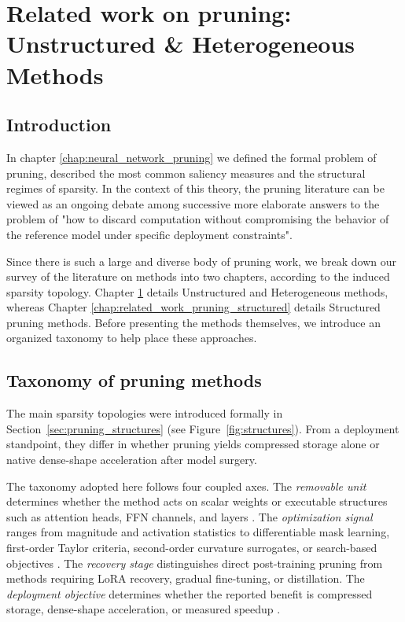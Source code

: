 \providecommand{\methoddetail}[1]{}
\providecommand{\methodsep}{}
\chapter{Related work on pruning: Unstructured \& Heterogeneous Methods}
\label{chap:related_work_pruning_unstructured}

\section{Introduction}

In chapter \ref{chap:neural_network_pruning} we defined the formal problem of pruning, described the most common saliency measures and the structural regimes of sparsity. In the context of this theory, the pruning literature can be viewed as an ongoing debate among successive more elaborate answers to the problem of "how to discard computation without compromising the behavior of the reference model under specific deployment constraints".

Since there is such a large and diverse body of pruning work, we break down our survey of the literature on methods into two chapters, according to the induced sparsity topology. Chapter \ref{chap:related_work_pruning_unstructured} details Unstructured and Heterogeneous methods, whereas Chapter \ref{chap:related_work_pruning_structured}
details Structured pruning methods. Before presenting the methods themselves, we introduce an organized taxonomy to help place these approaches.

\section{Taxonomy of pruning methods}
The main sparsity topologies were introduced formally in Section~\ref{sec:pruning_structures} (see Figure~\ref{fig:structures}). From a deployment standpoint, they differ in whether pruning yields compressed storage alone or native dense-shape acceleration after model surgery.

The taxonomy adopted here follows four coupled axes. The \emph{removable unit} determines whether the method acts on scalar weights or executable structures such as attention heads, FFN channels, and layers \cite{michel2022not,kurtic2022optimal}. The \emph{optimization signal} ranges from magnitude and activation statistics to differentiable mask learning, first-order Taylor criteria, second-order curvature surrogates, or search-based objectives \cite{sun2023simple,xia2022structured,ma2023llmpruner,frantar2023sparsegpt,kwon2022fast}. The \emph{recovery stage} distinguishes direct post-training pruning from methods requiring LoRA recovery, gradual fine-tuning, or distillation. The \emph{deployment objective} determines whether the reported benefit is compressed storage, dense-shape acceleration, or measured speedup \cite{kurtic2023ziplm,evopress2024,darwinlm2025}.

